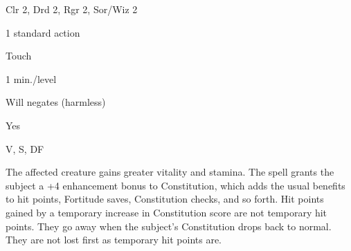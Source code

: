 
\begin{description*}
\item[Level:] Clr 2, Drd 2, Rgr 2, Sor/Wiz 2
\item[Casting Time:] 1 standard action
\item[Range:] Touch
\item[Duration:] 1 min./level
\item[Saving Throw:] Will negates (harmless)
\item[Spell Resistance:] Yes
\item[Components:] V, S, DF
\end{description*}

The affected creature gains greater vitality and stamina. The spell grants the
subject a +4 enhancement bonus to Constitution, which adds the usual benefits to
hit points, Fortitude saves, Constitution checks, and so forth.
Hit points gained by a temporary increase in Constitution score are not temporary
hit points. They go away when the subject's Constitution drops back to normal.
They are not lost first as temporary hit points are.
